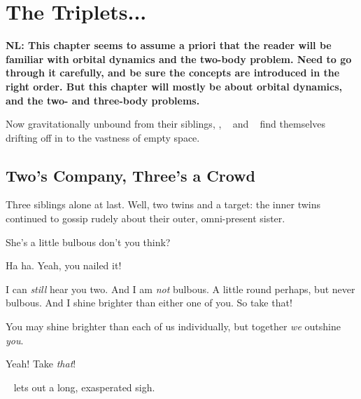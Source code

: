 \documentclass[main.tex]{subfiles}
\begin{document}
\chapter{The Triplets...}

\textbf{NL:  This chapter seems to assume a priori that the reader will be familiar with orbital dynamics and the two-body problem. Need to go through it carefully, and be sure the concepts are introduced in the right order.  But this chapter will mostly be about orbital dynamics, and the two- and three-body problems.}

 
\par \nar Now gravitationally unbound from their siblings, \rmtaygete, \rmalcyone~ and \rmcelaeno~ find themselves drifting off in to the vastness of empty space.  

\section{Two's Company, Three's a Crowd}

\par \nar Three siblings alone at last.  Well, two twins and a target: the inner twins continued to gossip rudely about their outer, omni-present sister.

\par \Taygete She's a little bulbous don't you think?

\par \Alcyone  Ha ha.  Yeah, you nailed it!

\par \Celaeno  I can \textit{still} hear you two.  And I am \textit{not} bulbous.  A little round perhaps, but never bulbous.  And I shine brighter than either one of you.  So take that!

\par \Alcyone You may shine brighter than each of us individually, but together \textit{we} outshine \textit{you}.  

\par \Taygete Yeah!  Take \textit{that}!

\par \nar \rmcelaeno~ lets out a long, exasperated sigh.
\end{document}

